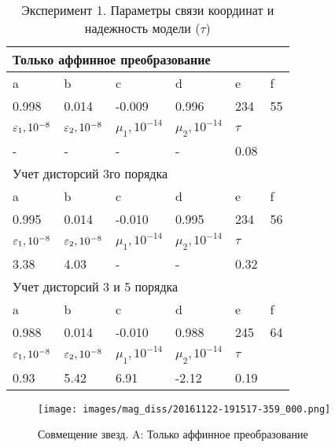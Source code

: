 \begin{table}[H]
\centering
\caption{Эксперимент 1. Параметры связи координат и надежность модели ($\tau$)}
\label{tab:aff_dist_coeffs}

\begin{tabular}{|l|l|l|l|l|l|}
\hline
\multicolumn{6}{|l|}{Только аффинное преобразование}\\ \hline
a     & b     & c       & d     & e      & f     \\ \hline
0.998 & 0.014 & -0.009  & 0.996 & 234 & 55 \\ \hline

$\varepsilon_1, 10^{-8}$ & $\varepsilon_2, 10^{-8}$ & $\mu_1, 10^{-14}$ & $\mu_2, 10^{-14}$ & $\tau$ & \\ \hline
-                 & -                 & -                 & -                 & 0.08   & \\ \hline

\hline
\multicolumn{6}{|l|}{Учет дисторсий 3го порядка}\\ \hline
a     & b     & c      & d     & e   & f  \\ \hline
0.995 & 0.014 & -0.010 & 0.995 & 234 & 56 \\ \hline

$\varepsilon_1, 10^{-8}$ & $\varepsilon_2, 10^{-8}$ & $\mu_1, 10^{-14}$ & $\mu_2, 10^{-14}$ & $\tau$ & \\ \hline
3.38              & 4.03              & -                 & -                 & 0.32   & \\ \hline

\hline
\multicolumn{6}{|l|}{Учет дисторсий 3 и 5 порядка}\\ \hline
a     & b     & c      & d     & e   & f  \\ \hline
0.988 & 0.014 & -0.010 & 0.988 & 245 & 64 \\ \hline

$\varepsilon_1, 10^{-8}$ & $\varepsilon_2, 10^{-8}$ & $\mu_1, 10^{-14}$ & $\mu_2, 10^{-14}$ & $\tau$ & \\ \hline
0.93              & 5.42              & 6.91              & -2.12             & 0.19   & \\ \hline
\end{tabular}
\end{table}

\begin{figure}[H]
  \centering
  \texttt{[image: images/mag\_diss/20161122-191517-359\_000.png]}
  \caption{Совмещение звезд. A: Только аффинное преобразование}
  \label{fig:center_aff}
\end{figure}%


